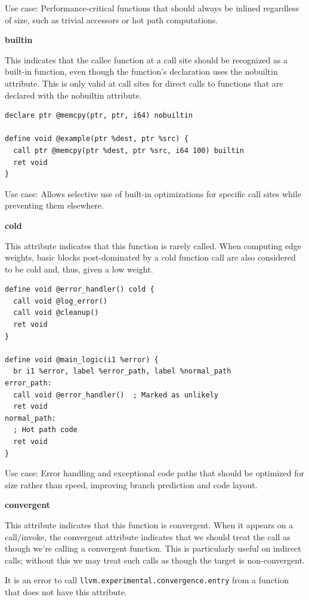 Use case: Performance-critical functions that should always be inlined regardless of size, such as trivial accessors or hot path computations.

\textbf{builtin}

This indicates that the callee function at a call site should be recognized as a built-in function, even though the function's declaration uses the nobuiltin attribute.
This is only valid at call sites for direct calls to functions that are declared with the nobuiltin attribute.

\begin{lstlisting}[style=ir]
declare ptr @memcpy(ptr, ptr, i64) nobuiltin

define void @example(ptr %dest, ptr %src) {
  call ptr @memcpy(ptr %dest, ptr %src, i64 100) builtin
  ret void
}
\end{lstlisting}

Use case: Allows selective use of built-in optimizations for specific call sites while preventing them elsewhere.

\textbf{cold}

This attribute indicates that this function is rarely called.
When computing edge weights, basic blocks post-dominated by a cold function call are also considered to be cold and, thus, given a low weight.

\begin{lstlisting}[style=ir]
define void @error_handler() cold {
  call void @log_error()
  call void @cleanup()
  ret void
}

define void @main_logic(i1 %error) {
  br i1 %error, label %error_path, label %normal_path
error_path:
  call void @error_handler()  ; Marked as unlikely
  ret void
normal_path:
  ; Hot path code
  ret void
}
\end{lstlisting}

Use case: Error handling and exceptional code paths that should be optimized for size rather than speed, improving branch prediction and code layout.

\textbf{convergent}

This attribute indicates that this function is convergent.
When it appears on a call/invoke, the convergent attribute indicates that we should treat the call as though we're calling a convergent function.
This is particularly useful on indirect calls; without this we may treat such calls as though the target is non-convergent.

It is an error to call \texttt{llvm.experimental.convergence.entry} from a function that does not have this attribute.

